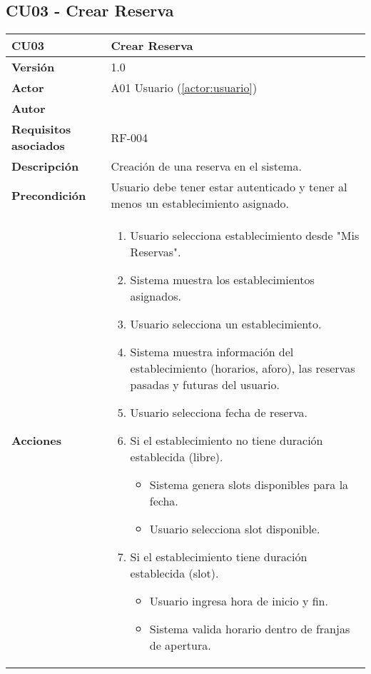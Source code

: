 \subsection{CU03 - Crear Reserva}

\begin{table}[H]
	\centering
	\begin{tabularx}{\linewidth}{ p{} p{} }
		\toprule
		\textbf{CU03}    & \textbf{Crear Reserva} \\
		\toprule
		\textbf{Versión}              & 1.0    \\
		\textbf{Actor}                & A01 Usuario (\ref{actor:usuario}) \\
		\textbf{Autor}                & \nombre \\
		\textbf{Requisitos asociados} & RF-004 \\
		\textbf{Descripción}          & Creación de una reserva en el sistema. \\
		\textbf{Precondición}         & Usuario debe tener estar autenticado y tener al menos un establecimiento asignado. \\
		\textbf{Acciones}             &
		\begin{enumerate}
			\def\labelenumi{\arabic{enumi}.}
			\tightlist
			\item Usuario selecciona establecimiento desde "Mis Reservas".
            \item Sistema muestra los establecimientos asignados.
            \item Usuario selecciona un establecimiento.
            \item Sistema muestra información del establecimiento (horarios, aforo), las reservas pasadas y futuras del usuario.
            \item Usuario selecciona fecha de reserva.
            \item Si el establecimiento no tiene duración establecida (libre).
   		\begin{itemize}
  			\item Sistema genera slots disponibles para la fecha.
			  \item Usuario selecciona slot disponible.
  		\end{itemize}
            \item Si el establecimiento tiene duración establecida (slot).
   		\begin{itemize}
  			\item Usuario ingresa hora de inicio y fin.
			  \item Sistema valida horario dentro de franjas de apertura.

\end{itemize}
\end{enumerate}
\end{tabularx}
\end{table}
